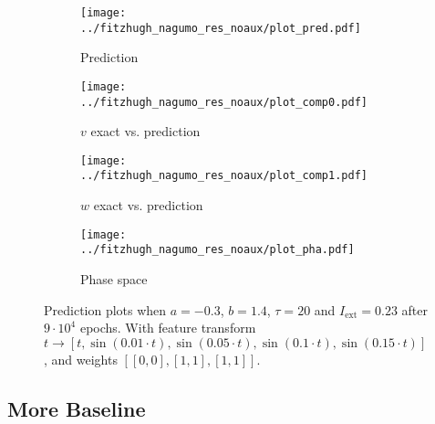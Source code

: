\documentclass[a4paper]{article}
\begin{document}
\begin{figure}[H]
	\centering 
	\begin{subfigure}[b]{0.47\textwidth}
		\centering
		\texttt{[image: ../fitzhugh\_nagumo\_res\_noaux/plot\_pred.pdf]}
		\caption{Prediction}
		\label{fig:weight07a}
	\end{subfigure}
	\begin{subfigure}[b]{0.47\textwidth}
		\centering
		\texttt{[image: ../fitzhugh\_nagumo\_res\_noaux/plot\_comp0.pdf]}
		\caption{$v$ exact vs. prediction}
		\label{fig:weight07b}
	\end{subfigure}
	\begin{subfigure}[b]{0.47\textwidth}
		\centering
		\texttt{[image: ../fitzhugh\_nagumo\_res\_noaux/plot\_comp1.pdf]}
		\caption{$w$ exact vs. prediction}
		\label{fig:weight07c}
	\end{subfigure}
	\begin{subfigure}[b]{0.47\textwidth}
		\centering
		\texttt{[image: ../fitzhugh\_nagumo\_res\_noaux/plot\_pha.pdf]}
		\caption{Phase space}
		\label{fig:weight07d}
	\end{subfigure}
	\caption{Prediction plots when $a=-0.3$, $b=1.4$, $\tau=20$ and $ I_{\text{ext}}=0.23$ after $9\cdot10^4$ epochs. With feature transform $t \rightarrow \left[ t, \sin(0.01 \cdot  t), \sin(0.05 \cdot  t), \sin(0.1 \cdot  t), \sin(0.15 \cdot  t)\right] $, and weights $\left[ \left[ 0, 0\right], \left[ 1, 1\right], \left[ 1, 1\right]\right]$.}
	\label{plot:weight07}
\end{figure} 	


\subsection{More Baseline}
\end{document}
